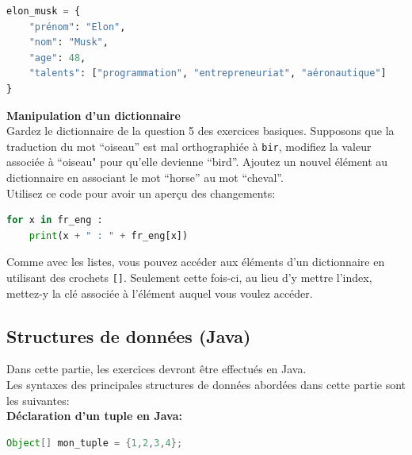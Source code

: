 	 \begin{lstlisting}[language=Python]
elon_musk = {
    "prénom": "Elon",
    "nom": "Musk",
    "age": 48,
    "talents": ["programmation", "entrepreneuriat", "aéronautique"]
}   \end{lstlisting}
		
    \begin{Exercice}[10 minutes] \textbf{Manipulation d'un dictionnaire}\\
       Gardez le dictionnaire de la question 5 des exercices basiques. Supposons que la traduction du mot ``oiseau'' est mal orthographiée à \texttt{bir}, modifiez la valeur associée à ``oiseau" pour qu'elle devienne ``bird''. Ajoutez un nouvel élément au dictionnaire en associant le mot ``horse'' au mot ``cheval''. \\
       
       Utilisez ce code pour avoir un aperçu des changements:
       
       \begin{lstlisting}[language=Python]
for x in fr_eng :
    print(x + " : " + fr_eng[x])   \end{lstlisting}
    
        \begin{conseil}
            Comme avec les listes, vous pouvez accéder aux éléments d'un dictionnaire en utilisant des crochets \lstinline{[]}. Seulement cette fois-ci, au lieu d'y mettre l'index, mettez-y la clé associée à l'élément auquel vous voulez accéder.
        \end{conseil}
        
        \begin{solution}
            
        \end{solution}
    \end{Exercice}
    
    
    \subsection{Structures de données (Java)}
    Dans cette partie, les exercices devront être effectués en Java. \\
    Les syntaxes des principales structures de données abordées dans cette partie sont les suivantes: \\
    \textbf{Déclaration d'un tuple en Java:}
     \begin{lstlisting}[language=Java]
              Object[] mon_tuple = {1,2,3,4}; \end{lstlisting} 
              
